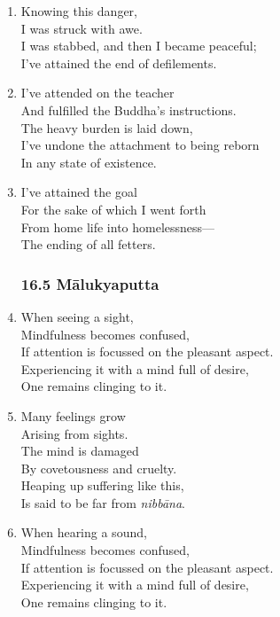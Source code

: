\documentclass[10pt, openany]{book}
\begin{document}
\begin{enumerate}
\item Knowing this danger,\\
I was struck with awe.\\
I was stabbed, and then I became peaceful;\\
I’ve attained the end of defilements.

\item I’ve attended on the teacher\\
And fulfilled the Buddha’s instructions.\\
The heavy burden is laid down,\\
I’ve undone the attachment to being reborn \\
In any state of existence.

\item I’ve attained the goal\\
For the sake of which I went forth\\
From home life into homelessness—\\
The ending of all fetters.

\subsubsection*{16.5 Mālukyaputta}

\item When seeing a sight, \\
Mindfulness becomes confused,\\
If attention is focussed on the pleasant aspect.\\
Experiencing it with a mind full of desire,\\
One remains clinging to it.

\item Many feelings grow\\
Arising from sights.\\
The mind is damaged\\
By covetousness and cruelty.\\
Heaping up suffering like this,\\
Is said to be far from \emph{nibbāna}.

\item When hearing a sound, \\
Mindfulness becomes confused,\\
If attention is focussed on the pleasant aspect.\\
Experiencing it with a mind full of desire,\\
One remains clinging to it.


\end{enumerate}
\end{document}
